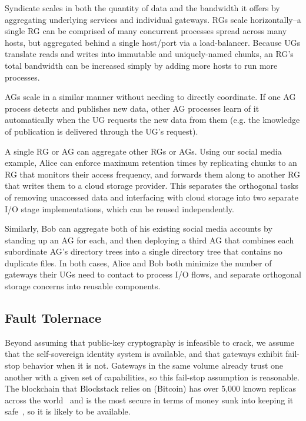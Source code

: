 Syndicate scales in both the quantity of data and the bandwidth it offers by
aggregating underlying services and individual gateways. RGs scale
horizontally--a single RG can be comprised of many concurrent processes
spread across many hosts, but aggregated behind a single host/port via a
load-balancer. Because UGs translate reads and writes into immutable and
uniquely-named chunks, an RG's total bandwidth can be increased simply by
adding more hosts to run more processes.

AGs scale in a similar manner without needing to directly coordinate. If one AG
process detects and publishes new data, other AG processes learn of it
automatically when the UG requests the new data from them (e.g. the knowledge of
publication is delivered through the UG's request).

A single RG or AG can aggregate other RGs or AGs. Using our social media
example, Alice can enforce maximum retention times by replicating chunks to an
RG that monitors their access frequency, and forwards them along to another RG
that writes them to a cloud storage provider. This separates the orthogonal
tasks of removing unaccessed data and interfacing with cloud storage into two
separate I/O stage implementations, which can be reused independently.

Similarly, Bob can aggregate both of his existing social media accounts by
standing up an AG for each, and then deploying a third AG that combines each
subordinate AG's directory trees into a single directory tree that contains
no duplicate files. In both cases, Alice and Bob both minimize the number of
gateways their UGs need to contact to process I/O flows, and separate orthogonal
storage concerns into reusable components.

\subsection{Fault Tolernace}

Beyond assuming that public-key cryptography is infeasible to crack, we assume
that the self-sovereign identity system is available, and that gateways exhibit
fail-stop behavior when it is not.  Gateways in the same volume already trust one another
with a given set of capabilities, so this fail-stop assumption is
reasonable. The blockchain that Blockstack relies on (Bitcoin) has over 5,000
known replicas across the world~\cite{coindance} and is the most secure in terms
of money sunk into keeping it safe~\cite{coinmarketcap}, so it is likely to be available.

